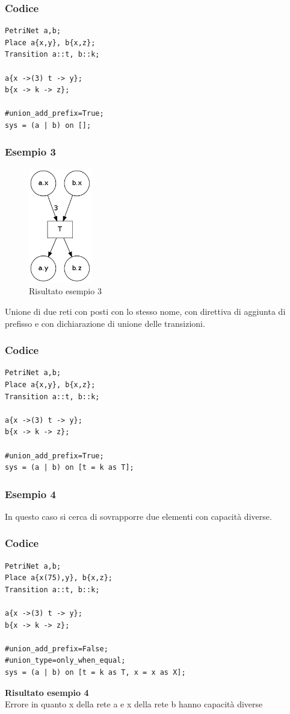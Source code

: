 \documentclass[italian,12pt]{book}
\begin{document}
\subsubsection{Codice}
\begin{verbatim}
PetriNet a,b;
Place a{x,y}, b{x,z};
Transition a::t, b::k;

a{x ->(3) t -> y};
b{x -> k -> z};

#union_add_prefix=True;
sys = (a | b) on [];
\end{verbatim}


\subsubsection{Esempio 3}
\begin{figure}[htb]
\centerline{\includegraphics[height=5cm]{img/unione_003.png}}
\caption{Risultato esempio 3}\label{fig:unione_003.png}
\end{figure}
Unione di due reti con posti con lo stesso nome, con direttiva di aggiunta
di prefisso e con dichiarazione di unione delle transizioni.\\
\subsubsection{Codice}
\begin{verbatim}
PetriNet a,b;
Place a{x,y}, b{x,z};
Transition a::t, b::k;

a{x ->(3) t -> y};
b{x -> k -> z};

#union_add_prefix=True;
sys = (a | b) on [t = k as T];
\end{verbatim}


\subsubsection{Esempio 4}
In questo caso si cerca di sovrapporre due elementi con capacità diverse.\\
\subsubsection{Codice}
\begin{verbatim}
PetriNet a,b;
Place a{x(75),y}, b{x,z};
Transition a::t, b::k;

a{x ->(3) t -> y};
b{x -> k -> z};

#union_add_prefix=False;
#union_type=only_when_equal;
sys = (a | b) on [t = k as T, x = x as X];
\end{verbatim}
{\bf Risultato esempio 4}\\
Errore in quanto x della rete a e x della rete b hanno capacità diverse
\end{document}
